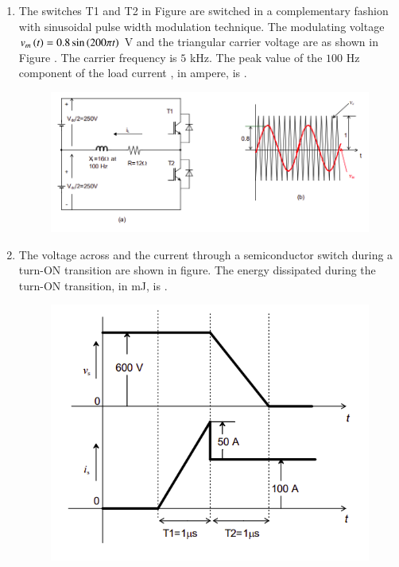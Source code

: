 \documentclass[journal,12pt,onecolumn]{IEEEtran}
\theoremstyle{remark}
\begin{document}
\begin{enumerate}[start=1, label=Q.\arabic*]
    \hfill{}

    \item The switches T1 and T2 in Figure  are switched in a complementary fashion with sinusoidal pulse width modulation technique. The modulating voltage $v_m\left(t\right) = 0.8 \sin \left(200\pi t\right)$ V and the triangular carrier voltage  are as shown in Figure . The carrier frequency is $5$ kHz. The peak value of the $100$ Hz component of the load current , in ampere, is \underline{\hspace{2cm}}.
    \begin{figure}[H]
        \includegraphics[width=0.8\columnwidth]{Figures/q44.png}
        \centering
        \caption{}
    \end{figure}

    \hfill{}

    \item The voltage  across and the current  through a semiconductor switch during a turn-ON transition are shown in figure. The energy dissipated during the turn-ON transition, in mJ, is \underline{\hspace{2cm}}.
    \begin{figure}[H]
        \includegraphics[width=0.6\columnwidth]{Figures/q45.png}
        \centering
        \caption{}
    \end{figure}


\end{enumerate}
\end{document}
